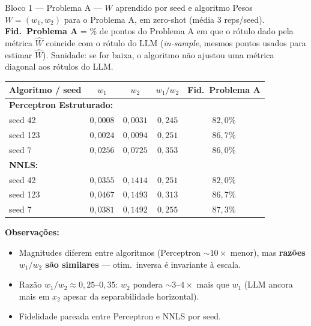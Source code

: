 \documentclass[aspectratio=169,10pt]{beamer}
\begin{document}
\begin{frame}{Bloco 1 --- Problema A --- $W$ aprendido por seed e algoritmo}
  \scriptsize
  Pesos $W = (w_1, w_2)$ para o Problema A, em zero-shot (m\'edia 3 reps/seed).
  \\[2pt]
  \textbf{Fid.\ Problema A} = \% de pontos do Problema A em que o r\'otulo dado pela m\'etrica $\hat W$ coincide com o r\'otulo do LLM (\emph{in-sample}, mesmos pontos usados para estimar $\hat W$). Sanidade: se for baixa, o algoritmo n\~ao ajustou uma m\'etrica diagonal aos r\'otulos do LLM.
  \begin{center}
  \begin{tabular}{lccc c}
    \toprule
    Algoritmo / seed & $w_1$ & $w_2$ & $w_1/w_2$ & Fid.\ Problema A \\
    \midrule
    \multicolumn{5}{l}{\textbf{Perceptron Estruturado:}} \\
    seed 42  & $0{,}0008$ & $0{,}0031$ & $0{,}245$ & $82{,}0\%$ \\
    seed 123 & $0{,}0024$ & $0{,}0094$ & $0{,}251$ & $86{,}7\%$ \\
    seed 7   & $0{,}0256$ & $0{,}0725$ & $0{,}353$ & $86{,}0\%$ \\
    \midrule
    \multicolumn{5}{l}{\textbf{NNLS:}} \\
    seed 42  & $0{,}0355$ & $0{,}1414$ & $0{,}251$ & $82{,}0\%$ \\
    seed 123 & $0{,}0467$ & $0{,}1493$ & $0{,}313$ & $86{,}7\%$ \\
    seed 7   & $0{,}0381$ & $0{,}1492$ & $0{,}255$ & $87{,}3\%$ \\
    \bottomrule
  \end{tabular}
  \end{center}
  \medskip
  \textbf{Observa\c{c}\~oes:}
  \begin{itemize}\setlength\itemsep{0.05em}
    \item Magnitudes diferem entre algoritmos (Perceptron $\sim 10\times$ menor), mas \textbf{raz\~oes $w_1/w_2$ s\~ao similares} --- otim.\ inversa \'e invariante \`a escala.
    \item Raz\~ao $w_1/w_2 \approx 0{,}25$--$0{,}35$: $w_2$ pondera $\sim 3$--$4\times$ mais que $w_1$ (LLM ancora mais em $x_2$ apesar da separabilidade horizontal).
    \item Fidelidade pareada entre Perceptron e NNLS por seed.
  \end{itemize}
\end{frame}
\end{document}

